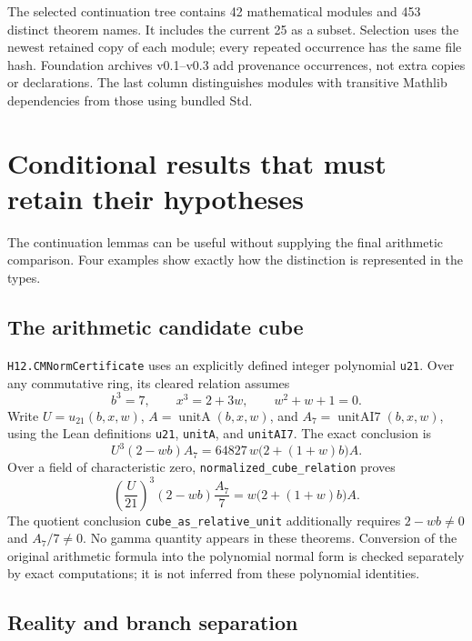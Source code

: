 \documentclass[11pt]{article}
\newcommand{\decl}[1]{\nolinkurl{#1}}
\begin{document}
The selected continuation tree contains 42 mathematical modules and 453 distinct theorem names. It includes the current 25 as a subset. Selection uses the newest retained copy of each module; every repeated occurrence has the same file hash. Foundation archives v0.1--v0.3 add provenance occurrences, not extra copies or declarations. The last column distinguishes modules with transitive Mathlib dependencies from those using bundled Std.



\clearpage
\section{Conditional results that must retain their hypotheses}

The continuation lemmas can be useful without supplying the final arithmetic comparison. Four examples show exactly how the distinction is represented in the types.

\subsection*{The arithmetic candidate cube}

\decl{H12.CMNormCertificate} uses an explicitly defined integer polynomial \decl{u21}. Over any commutative ring, its cleared relation assumes
\[
 b^3=7,\qquad x^3=2+3w,\qquad w^2+w+1=0.
\]
Write \(U=u_{21}(b,x,w)\), \(A=\operatorname{unitA}(b,x,w)\), and
\(A_7=\operatorname{unitAI7}(b,x,w)\), using the Lean definitions \decl{u21}, \decl{unitA}, and \decl{unitAI7}. The exact conclusion is
\[
 U^3(2-wb)A_7=64827\,w\bigl(2+(1+w)b\bigr)A.
\]
Over a field of characteristic zero, \decl{normalized_cube_relation} proves
\[
 \left(\frac{U}{21}\right)^3(2-wb)\frac{A_7}{7}
   =w\bigl(2+(1+w)b\bigr)A.
\]
The quotient conclusion \decl{cube_as_relative_unit} additionally requires
\(2-wb\ne0\) and \(A_7/7\ne0\). No gamma quantity appears in these theorems. Conversion of the original arithmetic formula into the polynomial normal form is checked separately by exact computations; it is not inferred from these polynomial identities.

\subsection*{Reality and branch separation}
\end{document}
